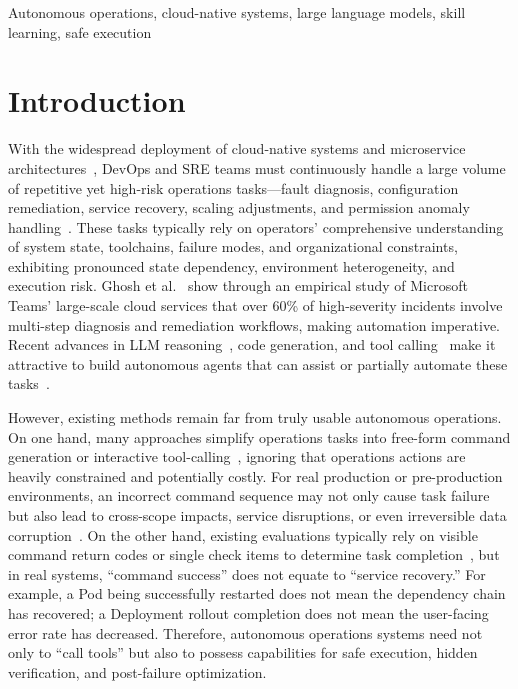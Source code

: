 \documentclass[conference,10pt]{IEEEtran}
\begin{document}
\begin{IEEEkeywords}
Autonomous operations, cloud-native systems, large language models, skill learning, safe execution
\end{IEEEkeywords}

\section{Introduction}

With the widespread deployment of cloud-native systems and microservice architectures~\cite{burns2022kubernetes}, DevOps and SRE teams must continuously handle a large volume of repetitive yet high-risk operations tasks---fault diagnosis, configuration remediation, service recovery, scaling adjustments, and permission anomaly handling~\cite{beyer2016sre}.
These tasks typically rely on operators' comprehensive understanding of system state, toolchains, failure modes, and organizational constraints, exhibiting pronounced state dependency, environment heterogeneity, and execution risk.
Ghosh et al.~\cite{ghosh2022incidents} show through an empirical study of Microsoft Teams' large-scale cloud services that over 60\% of high-severity incidents involve multi-step diagnosis and remediation workflows, making automation imperative.
Recent advances in LLM reasoning~\cite{wei2022chain}, code generation, and tool calling~\cite{yao2023react} make it attractive to build autonomous agents that can assist or partially automate these tasks~\cite{cheng2023aiops}.

However, existing methods remain far from truly usable autonomous operations.
On one hand, many approaches simplify operations tasks into free-form command generation or interactive tool-calling~\cite{roy2024rca_agents}, ignoring that operations actions are heavily constrained and potentially costly.
For real production or pre-production environments, an incorrect command sequence may not only cause task failure but also lead to cross-scope impacts, service disruptions, or even irreversible data corruption~\cite{ruan2023toolemu}.
On the other hand, existing evaluations typically rely on visible command return codes or single check items to determine task completion~\cite{ye2024toolsword}, but in real systems, ``command success'' does not equate to ``service recovery.''
For example, a Pod being successfully restarted does not mean the dependency chain has recovered; a Deployment rollout completion does not mean the user-facing error rate has decreased.
Therefore, autonomous operations systems need not only to ``call tools'' but also to possess capabilities for safe execution, hidden verification, and post-failure optimization.
\end{document}
